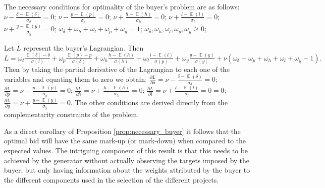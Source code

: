 \documentclass[informs]{informs3}
\begin{document}
 
\begin{proposition}\label{prop:necessary_buyer}
The necessary conditions for optimality of the buyer's problem are as follows:
$\nu - \frac{\delta-\mathop{\mathbb{E}}\left(\delta\right)}{\sigma_{\delta}}=0$;
$\nu - \frac{p-\mathop{\mathbb{E}}\left(p\right)}{\sigma_{p}}=0$;
$\nu + \frac{h-\mathop{\mathbb{E}}\left(h\right)}{\sigma_{h}}=0$;
$\nu + \frac{l-\mathop{\mathbb{E}}\left(l\right)}{\sigma_{l}}=0$;
$\nu + \frac{y-\mathop{\mathbb{E}}\left(y\right)}{\sigma_{y}}=0$;
$\omega_{\delta}+\omega_{h}+\omega_{l}+\omega_{p}+\omega_{y}=1 $;		
$\omega_{\delta},\omega_{h},\omega_{l},\omega_{p},\omega_{y} \geq 0$;
\end{proposition}
%
Let $L$ represent the buyer's Lagrangian. Then 
$L =\omega_{\delta}\frac{\mathop{\mathbb{E}}\left(\delta\right)-\delta }
{\sigma\left(l\right)}+\omega_{p}\frac{\mathop{\mathbb{E}}\left(p\right)-p}  {\sigma\left(\delta\right)} 
+\omega_{h}\frac{ h-\mathop{\mathbb{E}}\left(h\right)}
{\sigma\left(h\right)}+\omega_{l}\frac{ l-\mathop{\mathbb{E}}\left(l\right) }{\sigma\left(p\right)}+\omega_{y}\frac{y-\mathop{\mathbb{E}}\left(y\right)}{\sigma\left(y\right)}+\nu (\omega_{\delta}+\omega_{p}+\omega_{h}+\omega_{l}+\omega_{y}-1).$ 
Then by taking the partial derivative of the Lagrangian to each one of the variables and equating them to zero we obtain:
$\frac{\partial L}{\partial \delta} = \nu - \frac{\delta-\mathop{\mathbb{E}}\left(\delta\right)}{\sigma_{\delta}}=0$;
$\frac{\partial L}{\partial p} = \nu - \frac{p-\mathop{\mathbb{E}}\left(p\right)}{\sigma_{p}}=0$;
$\frac{\partial L}{\partial h} = \nu + \frac{h-\mathop{\mathbb{E}}\left(h\right)}{\sigma_{h}}=0$;
$\frac{\partial L}{\partial l} = \nu + \frac{l-\mathop{\mathbb{E}}\left(l\right)}{\sigma_{l}}=0=0$;
$\frac{\partial L}{\partial y} = \nu + \frac{y-\mathop{\mathbb{E}}\left(y\right)}{\sigma_{y}}=0$.
The other conditions are derived directly from the complementarity constraints of the problem. %
\Halmos
\endproof 

As a direct corollary of Proposition  \ref{prop:necessary_buyer} it follows that the optimal bid will have the same mark-up (or mark-down) when compared to the expected values. The intriguing component of this result is that this needs to be achieved by the generator without actually observing the targets imposed by the buyer, but only having information about the weights attributed by the buyer to the different components used in the selection of the different projects.  
\end{document}

